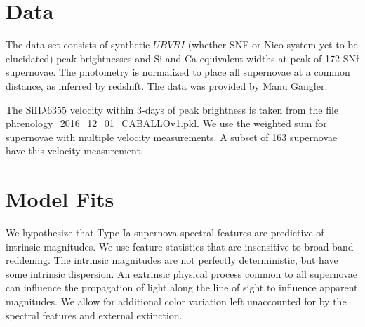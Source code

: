 \documentclass[11pt, oneside]{article}   	%
\begin{document}
\section{Data}
The data set consists of synthetic $UBVRI$ (whether SNF or Nico system yet to be elucidated)
peak brightnesses and Si and Ca equivalent widths at peak
of 172 SNf supernovae.  The photometry is normalized to place all supernovae at a common distance, as
inferred by redshift.
The data was provided by Manu Gangler.

The SiII$\lambda6355$ velocity within 3-days of peak brightness is taken from the file phrenology\_2016\_12\_01\_CABALLOv1.pkl.
We use the weighted sum for supernovae with multiple velocity measurements.  A subset of 163
supernovae have this velocity measurement.

\section{Model Fits}

We hypothesize that Type Ia supernova spectral features are predictive of intrinsic
magnitudes.  We use feature statistics that are insensitive to broad-band reddening.
The intrinsic magnitudes are not perfectly deterministic, but have some intrinsic dispersion.
An extrinsic physical process common to all supernovae can influence the propagation
of light along the line of sight to influence apparent magnitudes.
We allow for additional color variation left unaccounted for by the spectral features and external extinction.
\end{document}
